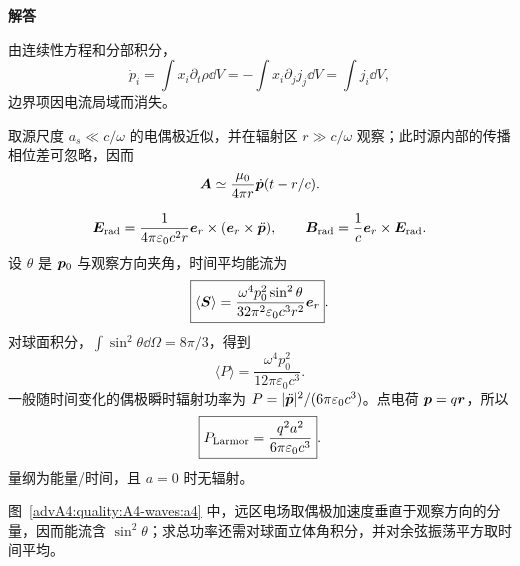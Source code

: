 \begin{advsolution}
\begin{center}\begin{minipage}{.96\linewidth}\centering
\raggedright{\bfseries\color{DeepBlue}解答}\par\smallskip\centering

\label{advA4:quality:A4-waves:a4}
\end{minipage}\end{center}

由连续性方程和分部积分，
\[
 \dot p_i=\int x_i\partial_t\rho\dd V
 =-\int x_i\partial_jj_j\dd V
 =\int j_i\dd V,
\]
边界项因电流局域而消失。

取源尺度 $a_s\ll c/\omega$ 的电偶极近似，并在辐射区 $r\gg c/\omega$ 观察；此时源内部的传播相位差可忽略，因而
\[
 \bm{A}\simeq\frac{\mu_0}{4\pi r}
 \dot{\bm{p}}(t-r/c).
\]


\[
 \bm{E}_{\rm rad}=\frac1{4\pi\varepsilon_0c^2r}
 \bm{e}_r\times(\bm{e}_r\times\ddot{\bm{p}}),
 \qquad
 \bm{B}_{\rm rad}=\frac1c\bm{e}_r\times\bm{E}_{\rm rad}.
\]
设 $\theta$ 是 $\bm{p}_0$ 与观察方向夹角，时间平均能流为
\[
 \boxed{\langle\bm{S}\rangle=
 \frac{\omega^4p_0^2\sin^2\theta}
 {32\pi^2\varepsilon_0c^3r^2}\bm{e}_r}.
\]
对球面积分，$\int\sin^2\theta\dd\Omega=8\pi/3$，得到
\[
 \boxed{\langle P\rangle=\frac{\omega^4p_0^2}
 {12\pi\varepsilon_0c^3}}.
\]
一般随时间变化的偶极瞬时辐射功率为
$P=|\ddot{\bm{p}}|^2/(6\pi\varepsilon_0c^3)$。点电荷
$\bm{p}=q\bm{r}$，所以
\[
 \boxed{P_{\rm Larmor}=\frac{q^2a^2}{6\pi\varepsilon_0c^3}}.
\]
量纲为能量/时间，且 $a=0$ 时无辐射。

图~\ref{advA4:quality:A4-waves:a4} 中，远区电场取偶极加速度垂直于观察方向的分量，因而能流含 $\sin^2\theta$；求总功率还需对球面立体角积分，并对余弦振荡平方取时间平均。
\end{advsolution}

